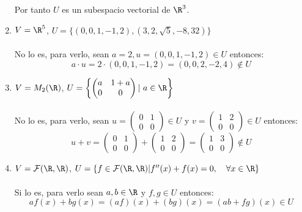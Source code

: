 \begin{ejercicio}
\begin{enumerate}
		      Por tanto $U$ es un subespacio vectorial de $\R^3$.
		\item $V = \R^5$, $U = \{(0,0,1,-1,2), (3,2,\sqrt{5},-8,32)\}$
		      \\ \\No lo es, para verlo, sean $a = 2, u = (0,0,1,-1,2) \in U$ entonces:
		      \begin{equation*}
			      a \cdot u = 2 \cdot (0,0,1,-1,2) = (0,0,2,-2,4) \notin U
		      \end{equation*}
		\item $V = M_2(\R)$, $U = \left\{\begin{pmatrix}
				      a & 1 + a \\
				      0 & 0
			      \end{pmatrix} \arrowvert \ a \in \R \right\}$
		      \\ \\ No lo es, para verlo, sean $u = \begin{pmatrix}
				      0 & 1 \\
				      0 & 0
			      \end{pmatrix} \in U$ y $v = \begin{pmatrix}
				      1 & 2 \\
				      0 & 0
			      \end{pmatrix} \in U$ entonces:
		      \begin{equation*}
			      u + v = \begin{pmatrix}
				      0 & 1 \\
				      0 & 0
			      \end{pmatrix} + \begin{pmatrix}
				      1 & 2 \\
				      0 & 0
			      \end{pmatrix} = \begin{pmatrix}
				      1 & 3 \\
				      0 & 0
			      \end{pmatrix} \notin U
		      \end{equation*}
		\item $V = \mathcal{F(\R,\R)}$, $U = \{f \in \mathcal{F(\R,\R)} | f''(x) + f(x) = 0, \quad \forall x \in \R\}$
		      \\ \\ Si lo es, para verlo sean $a,b \in \R$ y $f,g \in U$ entonces:
		      \begin{equation*}
			      af(x) + bg(x) = (af)(x) + (bg)(x) = (ab + fg)(x) \in U
		      \end{equation*}

\end{enumerate}
\end{ejercicio}
